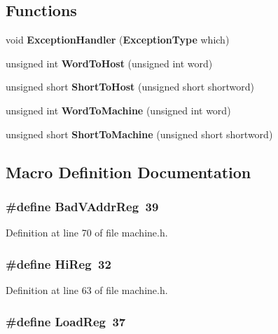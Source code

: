 \subsection*{Functions}
\begin{DoxyCompactItemize}
\item 
void {\bf Exception\+Handler} ({\bf Exception\+Type} which)
\item 
unsigned int {\bf Word\+To\+Host} (unsigned int word)
\item 
unsigned short {\bf Short\+To\+Host} (unsigned short shortword)
\item 
unsigned int {\bf Word\+To\+Machine} (unsigned int word)
\item 
unsigned short {\bf Short\+To\+Machine} (unsigned short shortword)
\end{DoxyCompactItemize}


\subsection{Macro Definition Documentation}
\subsubsection[{Bad\+V\+Addr\+Reg}]{\setlength{\rightskip}{0pt plus 5cm}\#define Bad\+V\+Addr\+Reg~39}\label{machine_8h_aceca7cc1b20f6970f96688c4f21efef2}


Definition at line 70 of file machine.\+h.

\subsubsection[{Hi\+Reg}]{\setlength{\rightskip}{0pt plus 5cm}\#define Hi\+Reg~32}\label{machine_8h_a1ac19b064328f966d7cca64f3282ae91}


Definition at line 63 of file machine.\+h.

\subsubsection[{Load\+Reg}]{\setlength{\rightskip}{0pt plus 5cm}\#define Load\+Reg~37}\label{machine_8h_a7ca86ddc51a5c44e599365ebce68b967}


